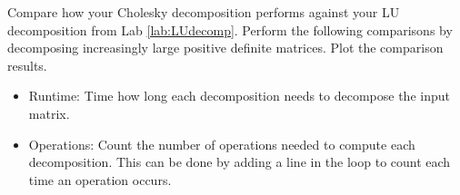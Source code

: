 \begin{problem}
Compare how your Cholesky decomposition performs against your LU decomposition from Lab \ref{lab:LUdecomp}.  Perform the following comparisons by decomposing increasingly large positive definite matrices.  Plot the comparison results.
\begin{itemize}
 \item Runtime: Time how long each decomposition needs to decompose the input matrix.
 \item Operations: Count the number of operations needed to compute each decomposition.  This can be done by adding a line in the loop to count each time an operation occurs.
\end{itemize}
\end{problem}
